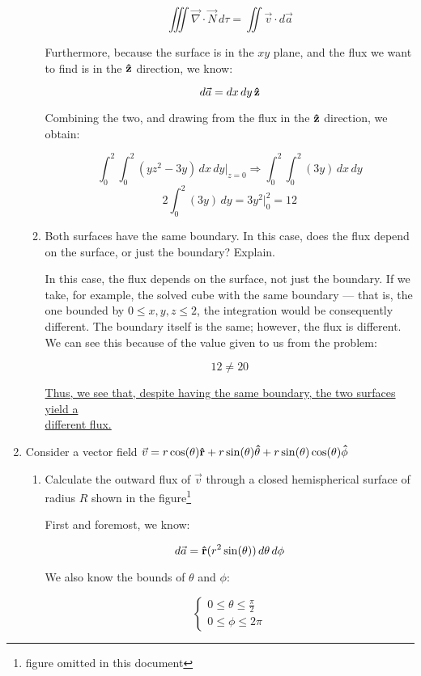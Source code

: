 \begin{enumerate}
\begin{enumerate}
        $$\iiint \vec{\nabla}\cdot\vec{N}\,d\tau=\iint\vec{v}\cdot d\vec{a}$$

        Furthermore, because the surface is in the $xy$ plane, and the flux we want to find is in the $\bold{\hat{z}}$ direction, we know:

        $$d\vec{a}=dx\,dy\,\bold{\hat{z}}$$

        Combining the two, and drawing from the flux in the $\bold{\hat{z}}$ direction, we obtain:

        $$\int_0^2\int_0^2 (yz^2-3y)\,dx\,dy\Big|_{z=0}\Rightarrow\int_0^2\int_0^2 (3y)\,dx\,dy$$
        $$\boxed{2\int_0^2 (3y)\,dy=3y^2\Big|_0^2=12}$$

      \item Both surfaces have the same boundary. In this case, does the flux depend on the surface, or just the boundary? Explain.

        In this case, the flux depends on the surface, not just the boundary. If we take, for example, the solved cube with the same boundary — that is, the one bounded by $0\leq x,y,z\leq 2$, the integration would be consequently different. The boundary itself is the same; however, the flux is different. We can see this because of the value given to us from the problem:

        $$12\neq20$$

      \underline{Thus, we see that, despite having the same boundary, the two surfaces yield a}\\\underline{ different flux.}

    \end{enumerate}

  \item Consider a vector field $\vec{v}=r\cos(\theta)\bold{\hat{r}}+r\sin(\theta)\bold{\hat{\theta}}+r\sin(\theta)\cos(\theta)\bold{\hat{\phi}}$

    \begin{enumerate}

      \item Calculate the outward flux of $\vec{v}$ through a closed hemispherical surface of radius $R$ shown in the figure\footnote{figure omitted in this document}

        First and foremost, we know:

        $$d\vec{a}=\bold{\hat{r}}(r^2\sin(\theta))\,d\theta\,d\phi$$

        We also know the bounds of $\theta$ and $\phi$:

        $$\left\{\begin{array}{l} 0\leq\theta\leq\frac{\pi}{2}\\0\leq\phi\leq2\pi\end{array}$$


\end{enumerate}
\end{enumerate}
